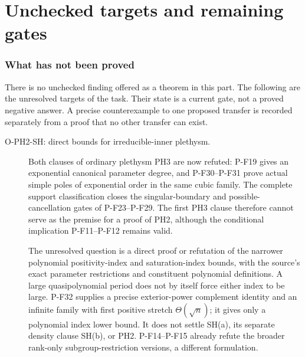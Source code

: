 \part{Unchecked targets and remaining gates}
\label{part:open}
\section{What has not been proved}
There is no unchecked finding offered as a theorem in this part. The
following are the unresolved targets of the task. Their state is a
current gate, not a proved negative answer. A precise counterexample to
one proposed transfer is recorded separately from a proof that no other
transfer can exist.

\begin{description}
\item[O-PH2-SH: direct bounds for irreducible-inner plethysm.]
Both clauses of ordinary plethysm PH3 are now refuted: P-F19 gives
an exponential canonical parameter degree, and P-F30--P-F31 prove
actual simple poles of exponential order in the same cubic family.
The complete support classification closes the singular-boundary
and possible-cancellation gates of P-F23--P-F29. The first PH3
clause therefore cannot serve as the premise for a proof of PH2,
although the conditional implication P-F11--P-F12 remains valid.

The unresolved question is a direct proof or refutation of the
narrower polynomial positivity-index and saturation-index bounds,
with the source's exact parameter restrictions and constituent
polynomial definitions. A large quasipolynomial period does not by
itself force either index to be large. P-F32 supplies a precise
exterior-power complement identity and an infinite family with
first positive stretch $\Theta(\sqrt n)$; it gives only a polynomial
index lower bound. It does not settle SH(a), its separate density
clause SH(b), or PH2. P-F14--P-F15 already refute the broader
rank-only subgroup-restriction versions, a different formulation.


\end{description}
